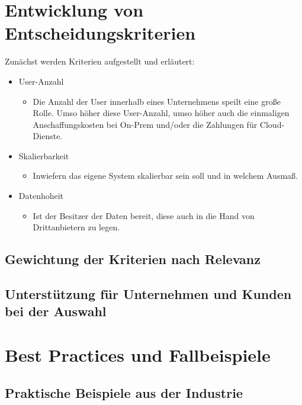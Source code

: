 \documentclass[12pt,bibtotoc]{article}
\begin{document}
			\section{Entwicklung von Entscheidungskriterien}
	Zunächst werden Kriterien aufgestellt und erläutert:
	\begin{itemize}
		\item User-Anzahl
		\begin{itemize}
			\item Die Anzahl der User innerhalb eines Unternehmens speilt eine große Rolle. Umso höher diese User-Anzahl, umso höher auch die einmaligen Anschaffungskosten bei On-Prem und/oder die Zahlungen für Cloud-Dienste.
		\end{itemize}
		\item Skalierbarkeit
			\begin{itemize}
				\item Inwiefern das eigene System skalierbar sein soll und in welchem Ausmaß.
			\end{itemize}
		\item Datenhoheit
			\begin{itemize}
				\item Ist der Besitzer der Daten bereit, diese auch in die Hand von Drittanbietern zu legen.
			\end{itemize}
	\end{itemize}
		\subsection{Gewichtung der Kriterien nach Relevanz}
		\subsection{Unterstützung für Unternehmen und Kunden bei der Auswahl}

	\section{Best Practices und Fallbeispiele}
		\subsection{Praktische Beispiele aus der Industrie}
\end{document}
